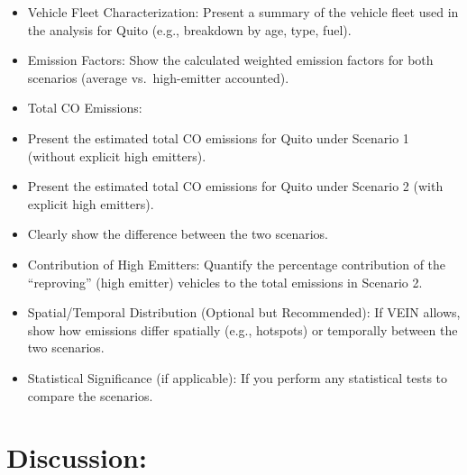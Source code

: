 \documentclass[atmosphere,article,submit,moreauthors,pdftex]{Definitions/mdpi}
\providecommand{\tightlist}{%
  \setlength{\itemsep}{0pt}\setlength{\parskip}{0pt}}
\begin{document}
\begin{itemize}
\tightlist
\item
  Vehicle Fleet Characterization: Present a summary of the vehicle fleet
  used in the analysis for Quito (e.g., breakdown by age, type, fuel).
\item
  Emission Factors: Show the calculated weighted emission factors for
  both scenarios (average vs.~high-emitter accounted).
\item
  Total CO Emissions:
\item
  Present the estimated total CO emissions for Quito under Scenario 1
  (without explicit high emitters).
\item
  Present the estimated total CO emissions for Quito under Scenario 2
  (with explicit high emitters).
\item
  Clearly show the difference between the two scenarios.
\item
  Contribution of High Emitters: Quantify the percentage contribution of
  the ``reproving'' (high emitter) vehicles to the total emissions in
  Scenario 2.
\item
  Spatial/Temporal Distribution (Optional but Recommended): If VEIN
  allows, show how emissions differ spatially (e.g., hotspots) or
  temporally between the two scenarios.
\item
  Statistical Significance (if applicable): If you perform any
  statistical tests to compare the scenarios.
\end{itemize}

\section{Discussion:}\label{discussion}
\end{document}
